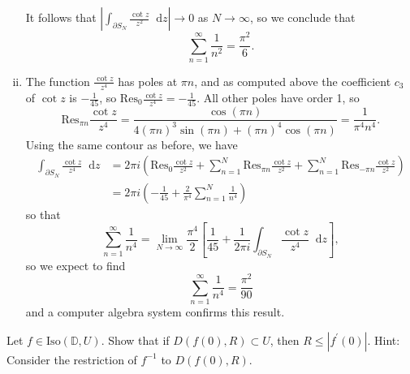 \documentclass{article}
\newcommand\Res{\mathrm{Res}}
\newcommand\dif{\mathop{}\!\mathrm{d}}
\newcounter{Problem}
\newenvironment{Problem}{\begin{Exercise}[name={Problem},
                                          counter={Problem}]}
                        {\end{Exercise}}
\begin{document}
\begin{Answer}
\begin{enumerate}[(i)]
{      It follows that
      $
      \left|
        \int_{\partial S_N}
          \frac{\cot z}{z^2}
          \dif z
      \right| \to 0$ as $N \to \infty$, so we conclude that
      $$
      \sum_{n=1}^\infty \frac{1}{n^2} = \frac{\pi^2}{6}.
      $$
    }
    \item{
      The function $\frac{\cot z}{z^4}$ has poles at $\pi n$,
      and as computed above the coefficient $c_3$ of $\cot z$
      is $-\frac{1}{45}$, so
      $\Res_0 \frac{\cot z}{z^4} = -\frac{1}{45}$. All other poles
      have order 1, so
      $$
        \Res_{\pi n} \frac{\cot z}{z^4}
      = \frac{\cos (\pi n)}
             { 4(\pi n)^3 \sin (\pi n)
             + (\pi n)^4 \cos (\pi n)}
      = \frac{1}{\pi^4 n^4}.
      $$
      Using the same contour as before, we have
      \begin{align*}
         \int_{\partial S_N}
           \frac{\cot z}{z^4}
           \dif z
      &= 2 \pi i
         \left(
           \Res_0 \frac{\cot z}{z^2}
         + \sum_{n=1}^N
             \Res_{\pi n}
               \frac{\cot z}{z^2}
         + \sum_{n=1}^N
             \Res_{-\pi n}
               \frac{\cot z}{z^2}
         \right) \\
      &= 2 \pi i
         \left(
         - \frac{1}{45}
         + \frac{2}{\pi^4}
           \sum_{n=1}^N
             \frac{1}{n^4}
         \right)
      \end{align*}
      so that
      $$
        \sum_{n=1}^\infty
          \frac{1}{n^4}
      = \lim_{N \to \infty}
          \frac{\pi^4}{2}
          \left[
            \frac{1}{45}
          + \frac{1}{2 \pi i}
            \int_{\partial S_N}
              \frac{\cot z}{z^4}
              \dif z
          \right],
      $$
      so we expect to find
      $$
        \sum_{n=1}^\infty
          \frac{1}{n^4}
      = \frac{\pi^2}{90}
      $$
      and a computer algebra system confirms this result.
    }
  \end{enumerate}
\end{Answer}

\begin{Problem}
Let $f \in \mathrm{Iso}(\mathbb{D}, U)$. Show that if
$D(f(0), R) \subset U$, then $R \leq |f^\prime(0)|$.
Hint: Consider the restriction of $f^{-1}$ to $D(f(0), R)$.
\end{Problem}
\end{document}
